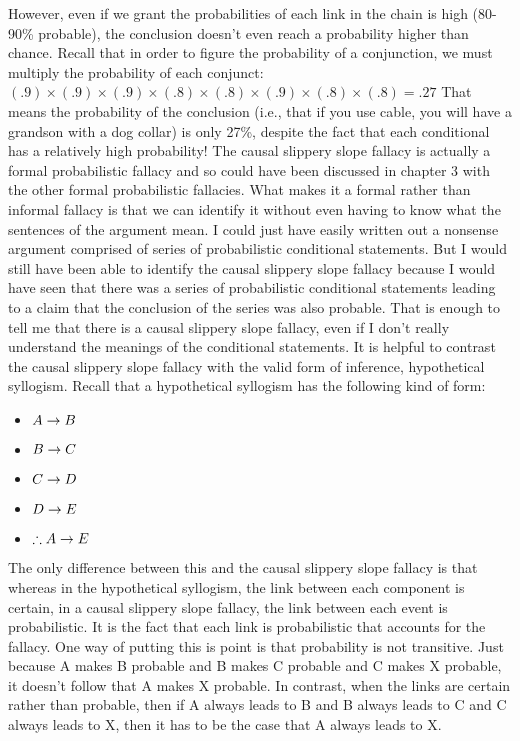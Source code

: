 However, even if we grant the probabilities of each link in the chain is high (80-
90\% probable), the conclusion doesn't even reach a probability higher than
chance. Recall that in order to figure the probability of a conjunction, we must
multiply the probability of each conjunct:
$(.9) \times (.9) \times (.9) \times (.8) \times (.8) \times (.9) \times (.8) \times (.8) = .27$
That means the probability of the conclusion (i.e., that if you use cable, you will
have a grandson with a dog collar) is only 27\%, despite the fact that each
conditional has a relatively high probability! The causal slippery slope fallacy is
actually a formal probabilistic fallacy and so could have been discussed in
chapter 3 with the other formal probabilistic fallacies. What makes it a formal
rather than informal fallacy is that we can identify it without even having to know
what the sentences of the argument mean. I could just have easily written out a
nonsense argument comprised of series of probabilistic conditional statements.
But I would still have been able to identify the causal slippery slope fallacy
because I would have seen that there was a series of probabilistic conditional
statements leading to a claim that the conclusion of the series was also probable.
That is enough to tell me that there is a causal slippery slope fallacy, even if I
don't really understand the meanings of the conditional statements.
It is helpful to contrast the causal slippery slope fallacy with the valid form of
inference, hypothetical syllogism. Recall that a hypothetical syllogism has the
following kind of form:
\begin{itemize}
\item $A \mathrel{\rightarrow} B$
\item $B \mathrel{\rightarrow} C$
\item $C \mathrel{\rightarrow} D$
\item $D \mathrel{\rightarrow} E$
\item $\therefore A \mathrel{\rightarrow} E$
\end{itemize}
The only difference between this and the causal slippery slope fallacy is that
whereas in the hypothetical syllogism, the link between each component is
certain, in a causal slippery slope fallacy, the link between each event is
probabilistic. It is the fact that each link is probabilistic that accounts for the
fallacy. One way of putting this is point is that probability is not transitive. Just
because A makes B probable and B makes C probable and C makes X probable,
it doesn't follow that A makes X probable. In contrast, when the links are certain
rather than probable, then if A always leads to B and B always leads to C and C
always leads to X, then it has to be the case that A always leads to X.

